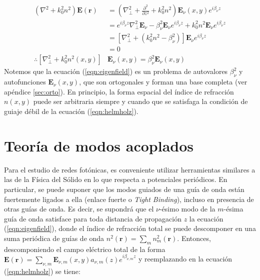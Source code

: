 \begin{align}
	(\nabla^2  + k_0^2n^2) \textbf{E}(\textbf{r}) &= \left(\nabla_\perp^2 + \frac{\partial^2}{\partial z^2} + k_0^2n^2\right) \textbf{E}_\nu(x, y)  e^{i\beta_\nu z} \nonumber
\\	
	&= e^{i\beta_\nu z} \nabla_\perp^2 \textbf{E}_\nu -\beta_\nu^2\textbf{E}_\nu e^{i\beta_\nu z} + k_0^2n^2 \textbf{E}_\nu  e^{i\beta_\nu z}
\nonumber	
	\\	
	&= \left[  \nabla_\perp^2  + (k_0^2n^2-\beta_\nu^2) \right]\textbf{E}_\nu  e^{i\beta_\nu z}
	\nonumber	
	\\
	&=
	0
	\nonumber
	\\
	\therefore
	 \left[  \nabla_\perp^2  + k_0^2n^2(x,y) \right]&\textbf{E}_\nu(x,y)  = \beta_\nu^2 \textbf{E}_\nu(x,y) \label{eqn:eigenfield}
\end{align}
Notemos que la ecuación (\ref{eqn:eigenfield}) es un problema de autovalores $\beta_\nu^2$ y autofunciones $\textbf{E}_\nu(x,y)$, que son ortogonales y forman una base completa (ver apéndice \ref{sec:orto}). En principio, la forma espacial del índice de refracción $n(x, y)$ puede ser arbitraria siempre y cuando que se satisfaga la condición de guiaje débil de la ecuación (\ref{eqn:helmholz}). 

\section{Teoría de modos acoplados}
	Para el estudio de redes fotónicas, es conveniente utilizar herramientas similares a las de la Física del Sólido en lo que respecta a potenciales periódicos. En particular, se puede suponer que los modos guiados de una guía de onda están fuertemente ligados a ella (enlace fuerte o \textit{Tight Binding}), incluso en presencia de otras guías de onda. Es decir, se supondrá que el $\nu$-ésimo modo de la $m$-ésima guía de onda satisface para toda distancia de propagación $z$ la ecuación (\ref{eqn:eigenfield}), donde el índice de refracción total se puede descomponer en una suma periódica de guías de onda $n^2(\textbf{r}) = \sum_{m} n^2_m(\textbf{r})$. Entonces, descomponiendo el campo eléctrico total de la forma $\textbf{E}(\textbf{r}) = \sum_{\nu, m} \textbf{E}_{\nu, m}(x, y) a_{\nu, m}(z) e^{i\beta_{\nu, m} z}$ y reemplazando en la ecuación (\ref{eqn:helmholz}) se tiene:

